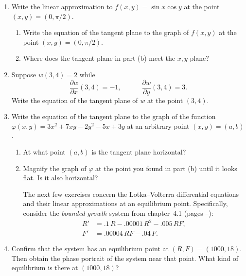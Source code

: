 \begin{enumerate}
\item Write the linear approximation to $f(x, y) = \sin{x} \cos{y}$ at
the point $(x, y) = (0, \pi/2)$.

  \begin{enumerate}
  \item Write the equation of the tangent plane to the graph of $f(x, y)$
at the point $(x, y) = (0, \pi/2)$.

  \item Where does the tangent plane in part (b) meet the $x, y$-plane?


\end{enumerate}
\item Suppose $w(3, 4) = 2$ while
	\[
\dfrac{\partial w}{\partial x}(3, 4) = -1, \qquad \quad
		\dfrac{\partial w}{\partial y} (3, 4) = 3.
\]  
Write the equation of the tangent plane of $w $ at the point $(3, 4)$.


\item Write the equation of the tangent plane to the graph of the
function $\varphi(x, y) = 3 x^2 + 7 xy - 2 y^2 - 5x + 3 y$ at an
arbitrary point $(x, y) = (a, b)$.

  \begin{enumerate}
  \item At what point $(a, b)$ is the tangent plane horizontal?

  \item Magnify the graph of $\varphi$ at the point you found in part (b)
until it looks flat.  Is it also horizontal?



The next few exercises concern the Lotka--Volterra differential
equations and their linear approximations at an equilibrium point.
Specifically, consider the {\em bounded growth\/} system from
chapter~4.1 (pages \pageref{L-V bounded
  growth-begin}--\pageref{L-V bounded growth-end}):
\begin{align*}
R' &=  .1\,R  - .00001\,R^2 - .005\,RF,   \\
F' &=  .00004\,RF - .04\,F.
\end{align*}




\end{enumerate}
\item Confirm that the system has an equilibrium point at $(R, F) =
(1000, 18)$.  Then obtain the phase portrait of the system near that
point.  What kind of equilibrium is there at $(1000, 18)$?



\end{enumerate}
